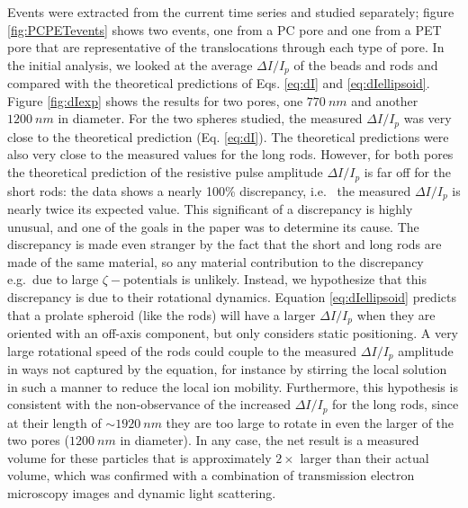 		Events were extracted from the current time series and studied separately; figure \ref{fig:PCPETevents} shows two events, one from a PC pore and one from a PET pore that are representative of the translocations through each type of pore. In the initial analysis, we looked at the average $\Delta I/I_{p}$ of the beads and rods and compared with the theoretical predictions of Eqs. \ref{eq:dI} and \ref{eq:dIellipsoid}. Figure \ref{fig:dIexp} shows the results for two pores, one $\SI{770}{nm}$ and another $\SI{1200}{nm}$ in diameter. For the two spheres studied, the measured $\Delta I/I_{p}$ was very close to the theoretical prediction (Eq. \ref{eq:dI}). The theoretical predictions were also very close to the measured values for the long rods. However, for both pores the theoretical prediction of the resistive pulse amplitude $\Delta I/I_{p}$ is far off for the short rods: the data shows a nearly 100\% discrepancy, i.e.~ the measured $\Delta I/I_{p}$ is nearly twice its expected value. This significant of a discrepancy is highly unusual, and one of the goals in the paper was to determine its cause. The discrepancy is made even stranger by the fact that the short and long rods are made of the same material, so any material contribution to the discrepancy e.g.~due to large $\zeta-\mathrm{potentials}$ is unlikely. Instead, we hypothesize that this discrepancy is due to their rotational dynamics. Equation \ref{eq:dIellipsoid} predicts that a prolate spheroid (like the rods) will have a larger $\Delta I/I_{p}$ when they are oriented with an off-axis component, but only considers static positioning. A very large rotational speed of the rods could couple to the measured $\Delta I/I_{p}$ amplitude in ways not captured by the equation, for instance by stirring the local solution in such a manner to reduce the local ion mobility. Furthermore, this hypothesis is consistent with the non-observance of the increased $\Delta I/I_{p}$ for the long rods, since at their length of $\sim\SI{1920}{nm}$ they are too large to rotate in even the larger of the two pores ($\SI{1200}{nm}$ in diameter). In any case, the net result is a measured volume for these particles that is approximately $2\times$ larger than their actual volume, which was confirmed with a combination of transmission electron microscopy images and dynamic light scattering. 
		
